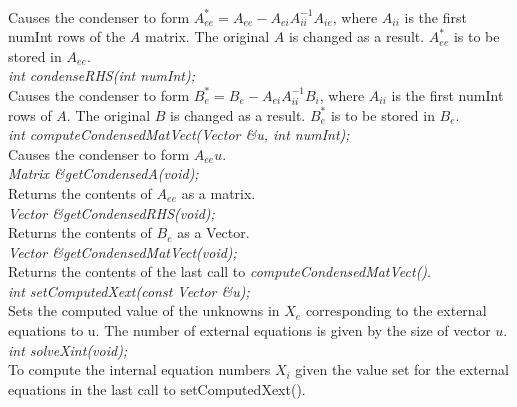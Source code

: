   \\
  \\

 \\
\\ 

  \\
 \\
Causes the condenser to form $A_{ee}^* = A_{ee} -A_{ei} A_{ii}^{-1} A_{ie}$, where
$A_{ii}$ is the first \p numInt rows of the $A$ matrix.  The
original $A$ is changed as a result. $A_{ee}^*$ is to be stored in $A_{ee}$. \\

{\em int condenseRHS(int numInt);} \\
Causes the condenser to form $B_e^* = B_e - A_{ei} A_{ii}^{-1} B_i$, where $A_{ii}$ 
is the first \p numInt rows of $A$. The original $B$ is changed as a result. 
$B_e^*$ is to be stored in $B_e$. \\

{\em int computeCondensedMatVect(Vector \&u, int numInt);} \\
Causes the condenser to form $A_{ee} u$. \\

{\em Matrix \&getCondensedA(void);} \\
Returns the contents of $A_{ee}$ as a matrix. \\

{\em Vector \&getCondensedRHS(void);} \\
Returns the contents of $B_e$ as a Vector. \\

{\em Vector \&getCondensedMatVect(void);} \\
Returns the contents of the last call to {\em
computeCondensedMatVect()}. \\

{\em int setComputedXext(const Vector \&u);} \\
Sets the computed value of the unknowns in $X_e$ corresponding to the
external equations to \p u. The number of external equations is
given by the size of vector $u$.\\

{\em  int solveXint(void);} \\
To compute the internal equation numbers $X_i$ given the value set
for the external equations in the last call to setComputedXext(). \\



